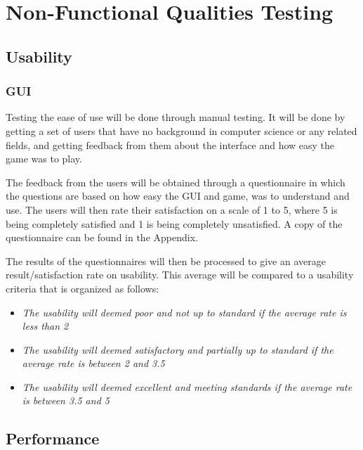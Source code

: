 \documentclass[12pt]{article}
\begin{document}
\section{Non-Functional Qualities Testing}
\subsection{Usability}
\subsubsection{GUI}
	Testing the ease of use will be done through manual testing. It will be done by getting a set of users that have no background in computer science or any related fields, and getting feedback from them about the interface and how easy the game was to play.
	\par The feedback from the users will be obtained through a questionnaire in which the questions are based on how easy the GUI and game, was to understand and use. The users will then rate their satisfaction on a scale of 1 to 5, where 5 is being completely satisfied and 1 is being completely unsatisfied. A copy of the questionnaire can be found in the Appendix.
	\par The results of the questionnaires will then be processed to give an average result/satisfaction rate on usability. This average will be compared to a usability criteria that is organized as follows:
\begin{itemize}
\item\emph{The usability will deemed poor and not up to standard if the average rate is less than 2}
\item\emph{The usability will deemed satisfactory and partially up to standard if the average rate is between 2 and 3.5}
\item\emph{The usability will deemed excellent and meeting standards if the average rate is between 3.5 and 5}

\end{itemize}

\subsection{Performance}
\end{document}
